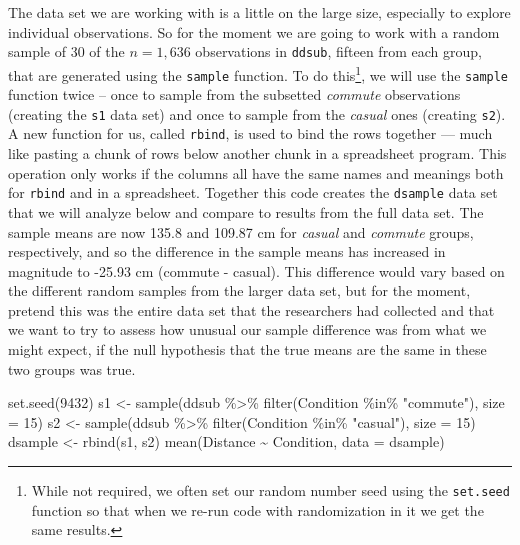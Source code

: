 \documentclass[
]{book}
\newenvironment{Shaded}{\begin{snugshade}}{\end{snugshade}}
\newcommand{\AttributeTok}[1]{\textcolor[rgb]{0.77,0.63,0.00}{#1}}
\newcommand{\DecValTok}[1]{\textcolor[rgb]{0.00,0.00,0.81}{#1}}
\newcommand{\FunctionTok}[1]{\textcolor[rgb]{0.00,0.00,0.00}{#1}}
\newcommand{\NormalTok}[1]{#1}
\newcommand{\OtherTok}[1]{\textcolor[rgb]{0.56,0.35,0.01}{#1}}
\newcommand{\SpecialCharTok}[1]{\textcolor[rgb]{0.00,0.00,0.00}{#1}}
\newcommand{\StringTok}[1]{\textcolor[rgb]{0.31,0.60,0.02}{#1}}
\begin{document}
\indent The data set we are working with is a little on the large size, especially to explore individual observations. So for the moment we are going to work with a random sample of 30 of the \(n = 1,636\) observations in \texttt{ddsub}, fifteen from each group, that are generated using the \texttt{sample} function. To do this\footnote{While not required, we often set our random number seed using the \texttt{set.seed} function so that when we re-run code with randomization in it we get the same results. }, we will use the \texttt{sample} function  twice -- once to sample from the subsetted \emph{commute} observations (creating the \texttt{s1} data set) and once to sample from the \emph{casual} ones (creating \texttt{s2}). A new function for us, called \texttt{rbind},  is used to bind the rows together --- much like pasting a chunk of rows below another chunk in a spreadsheet program. This operation only works if the columns all have the same names and meanings both for \texttt{rbind} and in a spreadsheet. Together this code creates the \texttt{dsample} data set that we will analyze below and compare to results from the full data set. The sample means are now 135.8 and 109.87 cm for \emph{casual} and \emph{commute} groups, respectively, and so the difference in the sample means has increased in magnitude to -25.93 cm (commute - casual). This difference would vary based on the different random samples from the larger data set, but for the moment, pretend this was the entire data set that the researchers had collected and that we want to try to assess how unusual our sample difference was from what we might expect, if the null hypothesis that the true means are the same in these two groups was true.

\begin{Shaded}
\begin{Highlighting}[]
\FunctionTok{set.seed}\NormalTok{(}\DecValTok{9432}\NormalTok{)}
\NormalTok{s1 }\OtherTok{\textless{}{-}} \FunctionTok{sample}\NormalTok{(ddsub }\SpecialCharTok{\%\textgreater{}\%} \FunctionTok{filter}\NormalTok{(Condition }\SpecialCharTok{\%in\%} \StringTok{"commute"}\NormalTok{), }\AttributeTok{size =} \DecValTok{15}\NormalTok{)}
\NormalTok{s2 }\OtherTok{\textless{}{-}} \FunctionTok{sample}\NormalTok{(ddsub }\SpecialCharTok{\%\textgreater{}\%} \FunctionTok{filter}\NormalTok{(Condition }\SpecialCharTok{\%in\%} \StringTok{"casual"}\NormalTok{), }\AttributeTok{size =} \DecValTok{15}\NormalTok{)}
\NormalTok{dsample }\OtherTok{\textless{}{-}} \FunctionTok{rbind}\NormalTok{(s1, s2)}
\FunctionTok{mean}\NormalTok{(Distance }\SpecialCharTok{\textasciitilde{}}\NormalTok{ Condition, }\AttributeTok{data =}\NormalTok{ dsample)}
\end{Highlighting}
\end{Shaded}
\end{document}
